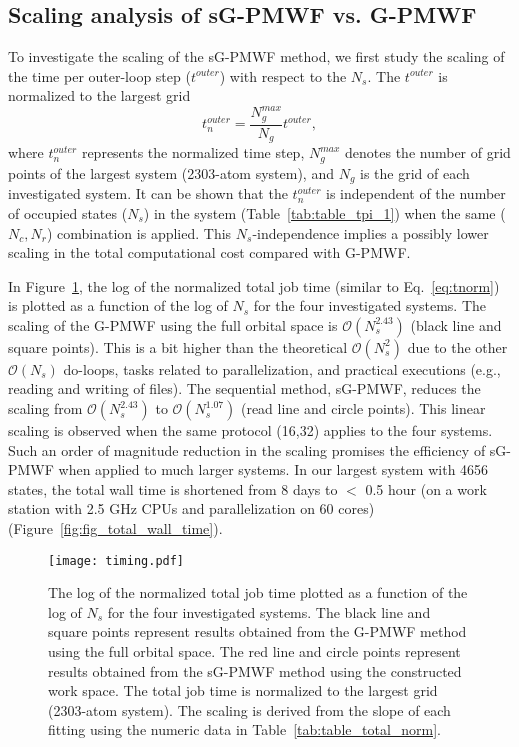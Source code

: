 \documentclass[journal=jacsat,manuscript=article]{achemso}
\begin{document}
\subsection{Scaling analysis of sG-PMWF vs. G-PMWF}
To investigate the scaling of the sG-PMWF method, we first study the scaling of the time per outer-loop step ($t^{outer}$) with respect to the $N_s$. The $t^{outer}$ is normalized to the largest grid
\begin{equation}
    t^{outer}_n = \frac{N_{g}^{max}}{N_{g}} t^{outer},
\label{eq:tnorm}
\end{equation}
where $t^{outer}_n$ represents the normalized time step, $N_{g}^{max}$ denotes the number of grid points of the largest system (2303-atom system), and $N_{g}$ is the grid of each investigated system. It can be shown that the $t^{outer}_n$ is independent of the number of occupied states ($N_s$) in the system (Table~\ref{tab:table_tpi_1}) when the same ($N_c,N_r$) combination is applied. This $N_s$-independence implies a possibly lower scaling in the total computational cost compared with G-PMWF.

In Figure~\ref{fig:fig_wall_time_Ns}, the log of the normalized total job time (similar to Eq.~\eqref{eq:tnorm}) is plotted as a function of the log of $N_s$ for the four investigated systems. The scaling of the G-PMWF using the full orbital space is $\mathcal{O}(N_s^{2.43})$ (black line and square points). This is a bit higher than the theoretical $\mathcal{O}(N_s^{2})$ due to the other $\mathcal{O}(N_s)$ do-loops, tasks related to parallelization, and practical executions (e.g., reading and writing of files). The sequential method, sG-PMWF, reduces the scaling from $\mathcal{O}(N_s^{2.43})$ to $\mathcal{O}(N_s^{1.07})$ (read line and circle points). This linear scaling is observed when the same protocol (16,32) applies to the four systems. Such an order of magnitude reduction in the scaling promises the efficiency of sG-PMWF when applied to much larger systems. In our largest system with 4656 states, the total wall time is shortened from 8 days to $<$ 0.5 hour (on a work station with 2.5 GHz CPUs and parallelization on 60 cores)  (Figure~\ref{fig:fig_total_wall_time}).

\begin{figure}
    \centering
    \texttt{[image: timing.pdf]}
    \caption{The log of the normalized total job time plotted as a function of the log of $N_s$ for the four investigated systems. The black line and square points represent results obtained from the G-PMWF method using the full orbital space. The red line and circle points represent results obtained from the sG-PMWF method using the constructed work space. The total job time is normalized to the largest grid (2303-atom system). The scaling is derived from the slope of each fitting using the numeric data in Table~\ref{tab:table_total_norm}.} 
    \label{fig:fig_wall_time_Ns}
\end{figure}
\end{document}

